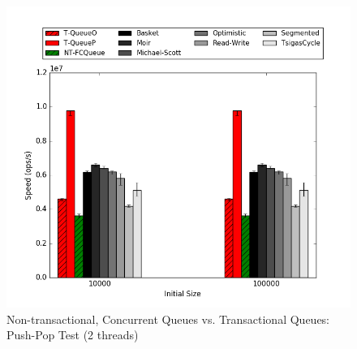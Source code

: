 \begin{figure}[H]
    \centering
    \includegraphics[width=\textwidth]{concurrent/allQ:PushPop.png}
    \caption{Non-transactional, Concurrent Queues vs. Transactional Queues: Push-Pop Test (2 threads)}
\end{figure}

